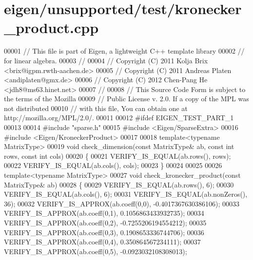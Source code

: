 \hypertarget{eigen_2unsupported_2test_2kronecker__product_8cpp_source}{}\section{eigen/unsupported/test/kronecker\+\_\+product.cpp}
\label{eigen_2unsupported_2test_2kronecker__product_8cpp_source}

\begin{DoxyCode}
00001 \textcolor{comment}{// This file is part of Eigen, a lightweight C++ template library}
00002 \textcolor{comment}{// for linear algebra.}
00003 \textcolor{comment}{//}
00004 \textcolor{comment}{// Copyright (C) 2011 Kolja Brix <brix@igpm.rwth-aachen.de>}
00005 \textcolor{comment}{// Copyright (C) 2011 Andreas Platen <andiplaten@gmx.de>}
00006 \textcolor{comment}{// Copyright (C) 2012 Chen-Pang He <jdh8@ms63.hinet.net>}
00007 \textcolor{comment}{//}
00008 \textcolor{comment}{// This Source Code Form is subject to the terms of the Mozilla}
00009 \textcolor{comment}{// Public License v. 2.0. If a copy of the MPL was not distributed}
00010 \textcolor{comment}{// with this file, You can obtain one at http://mozilla.org/MPL/2.0/.}
00011 
00012 \textcolor{preprocessor}{#ifdef EIGEN\_TEST\_PART\_1}
00013 
00014 \textcolor{preprocessor}{#include "sparse.h"}
00015 \textcolor{preprocessor}{#include <Eigen/SparseExtra>}
00016 \textcolor{preprocessor}{#include <Eigen/KroneckerProduct>}
00017 
00018 \textcolor{keyword}{template}<\textcolor{keyword}{typename} MatrixType>
00019 \textcolor{keywordtype}{void} check\_dimension(\textcolor{keyword}{const} MatrixType& ab, \textcolor{keyword}{const} \textcolor{keywordtype}{int} rows,  \textcolor{keyword}{const} \textcolor{keywordtype}{int} cols)
00020 \{
00021   VERIFY\_IS\_EQUAL(ab.rows(), rows);
00022   VERIFY\_IS\_EQUAL(ab.cols(), cols);
00023 \}
00024 
00025 
00026 \textcolor{keyword}{template}<\textcolor{keyword}{typename} MatrixType>
00027 \textcolor{keywordtype}{void} check\_kronecker\_product(\textcolor{keyword}{const} MatrixType& ab)
00028 \{
00029   VERIFY\_IS\_EQUAL(ab.rows(), 6);
00030   VERIFY\_IS\_EQUAL(ab.cols(), 6);
00031   VERIFY\_IS\_EQUAL(ab.nonZeros(),  36);
00032   VERIFY\_IS\_APPROX(ab.coeff(0,0), -0.4017367630386106);
00033   VERIFY\_IS\_APPROX(ab.coeff(0,1),  0.1056863433932735);
00034   VERIFY\_IS\_APPROX(ab.coeff(0,2), -0.7255206194554212);
00035   VERIFY\_IS\_APPROX(ab.coeff(0,3),  0.1908653336744706);
00036   VERIFY\_IS\_APPROX(ab.coeff(0,4),  0.350864567234111);
00037   VERIFY\_IS\_APPROX(ab.coeff(0,5), -0.0923032108308013);

\end{DoxyCode}
